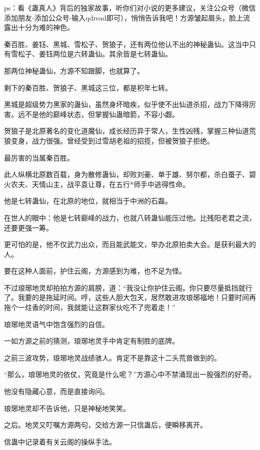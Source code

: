 
\begin{this_body}

ps：看《蛊真人》背后的独家故事，听你们对小说的更多建议，关注公众号（微信添加朋友-添加公众号-输入qdread即可），悄悄告诉我吧！方源皱起眉头，脸上流露出十分为难的神色。

秦百胜、姜钰、黑城、雪松子、贺狼子，还有两位他认不出的神秘蛊仙。这当中只有雪松子、姜钰两位是六转蛊仙。其余皆是七转蛊仙。

那两位神秘蛊仙，方源不知跟脚，也就算了。

剩下的秦百胜、贺狼子、黑城这三位，都是积年七转。

黑城是超级势力黑家的蛊仙，虽然身坏暗疾，似乎使不出仙道杀招，战力下降得厉害。远不是他的巅峰状态，但掌握仙蛊暗箭，不容小觑。

贺狼子是北原著名的变化道魔仙，成长经历异于常人，生性凶残，掌握三种仙道荒狼变身，战力很强。曾经受到过雪胡老祖的招揽，但被贺狼子拒绝。

最厉害的当属秦百胜。

此人纵横北原数百载，身为散修蛊仙，却败刘豪、单于雄、努尔都，杀白蚕子、碧火农夫、天情山主，战平袁让尊，在五行*师手中逃得性命。

他是七转蛊仙，在北原的地位，就相当于中洲的石磊。

在世人的眼中：他是七转巅峰的战力，也就八转蛊仙能压过他。比残阳老君之流，还要更强一筹。

更可怕的是，他不仅武力出众，而且能武能文，举办北原拍卖大会。是获利最大的人。

要在这种人面前，护住云阁，方源感到为难，也不足为怪。

不过琅琊地灵却拍拍方源的肩膀，道：“我没让你护住云阁。你只要尽量抵挡就行了。我要的是拖延时间。哼，这些人胆大包天，居然敢进攻琅琊福地！只要时间再拖个一炷香的时间，我就能让这群家伙吃不了兜着走！”

琅琊地灵语气中饱含强烈的自信。

一如方源之前的猜测，琅琊地灵手中肯定有制胜的底牌。

之前三波攻势，琅琊地灵战绩骇人。肯定不是靠这十二头荒兽做到的。

“那么，琅琊地灵的依仗，究竟是什么呢？”方源心中不禁涌现出一股强烈的好奇。

他没有隐藏心意，而是直接询问。

琅琊地灵却不告诉他，只是神秘地笑笑。

之后。地灵又叮嘱方源两句，交给方源一只信蛊后，便瞬移离开。

信蛊中记录着有关云阁的操纵手法。


\end{this_body}
